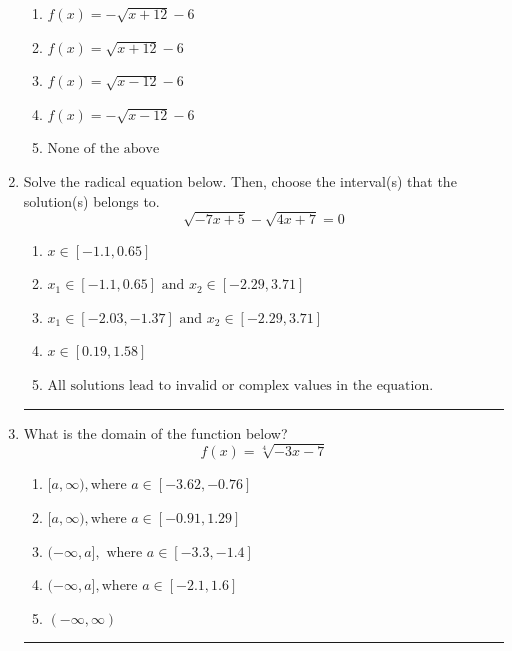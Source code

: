 \documentclass[14pt]{extbook}
\newcommand{\litem}[1]{\item#1\hspace*{-1cm}\rule{\textwidth}{0.4pt}}
\begin{document}
\begin{enumerate}
{\begin{center}
\end{center}
\begin{enumerate}[label=\Alph*.]
\item \( f(x) = - \sqrt{x + 12} - 6 \)
\item \( f(x) = \sqrt{x + 12} - 6 \)
\item \( f(x) = \sqrt{x - 12} - 6 \)
\item \( f(x) = - \sqrt{x - 12} - 6 \)
\item \( \text{None of the above} \)

\end{enumerate} }
\litem{
Solve the radical equation below. Then, choose the interval(s) that the solution(s) belongs to.\[ \sqrt{-7 x + 5} - \sqrt{4 x + 7} = 0 \]\begin{enumerate}[label=\Alph*.]
\item \( x \in [-1.1,0.65] \)
\item \( x_1 \in [-1.1, 0.65] \text{ and } x_2 \in [-2.29,3.71] \)
\item \( x_1 \in [-2.03, -1.37] \text{ and } x_2 \in [-2.29,3.71] \)
\item \( x \in [0.19,1.58] \)
\item \( \text{All solutions lead to invalid or complex values in the equation.} \)

\end{enumerate} }
\litem{
What is the domain of the function below?\[ f(x) = \sqrt[4]{-3 x - 7} \]\begin{enumerate}[label=\Alph*.]
\item \( [a, \infty), \text{where } a \in [-3.62, -0.76] \)
\item \( [a, \infty), \text{where } a \in [-0.91, 1.29] \)
\item \( (-\infty, a], \text{ where } a \in [-3.3, -1.4] \)
\item \( (-\infty, a], \text{where } a \in [-2.1, 1.6] \)
\item \( (-\infty, \infty) \)

\end{enumerate} }
\end{enumerate}
\end{document}
